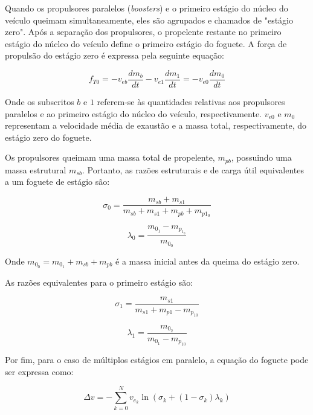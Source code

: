 \par Quando os propulsores paralelos (\textit{boosters}) e o primeiro estágio do núcleo do veículo queimam simultaneamente, eles são agrupados e chamados de "estágio zero". Após a separação dos propulsores, o propelente restante no primeiro estágio do núcleo do veículo define o primeiro estágio do foguete. A força de propulsão do estágio zero é expressa pela seguinte equação:

\begin{equation}
f_{T0} = -v_{eb}\frac{dm_b}{dt} - v_{e1}\frac{dm_1}{dt} = -v_{e0}\frac{dm_0}{dt}
\end{equation}

\par Onde os subscritos $b$ e $1$ referem-se às quantidades relativas aos propulsores paralelos e ao primeiro estágio do núcleo do veículo, respectivamente. $v_{e0}$ e $m_0$ representam a velocidade média de exaustão e a massa total, respectivamente, do estágio zero do foguete.

\par Os propulsores queimam uma massa total de propelente, $m_{pb}$, possuindo uma massa estrutural $m_{sb}$. Portanto, as razões estruturais e de carga útil equivalentes a um foguete de estágio são:

\begin{equation}
\sigma_0 = \frac{m_{sb} + m_{s1}}{m_{sb} + m_{s1} + m_{pb} + m_{p1_0}}
\end{equation}

\begin{equation}
\lambda_0 = \frac{m_{0_1} - m_{p_{1_0}}}{m_{0_0}}
\end{equation}

Onde $m_{0_0} = m_{0_1} + m_{sb} + m_{pb}$ é a massa inicial antes da queima do estágio zero.

\par As razões equivalentes para o primeiro estágio são:

\begin{equation}
\sigma_1 = \frac{m_{s1}}{m_{s1} + m_{p1} - m_{p_{10}}}
\end{equation}

\begin{equation}
\lambda_1 = \frac{m_{0_2}}{m_{0_1} - m_{p_{10}}}
\end{equation}

Por fim, para o caso de múltiplos estágios em paralelo, a equação do foguete pode ser expressa como:

\begin{equation}
\Delta v = -\sum_{k=0}^{N} v_{e_k} \ln\left(\sigma_k + (1 - \sigma_k)\lambda_k\right)
\end{equation}






